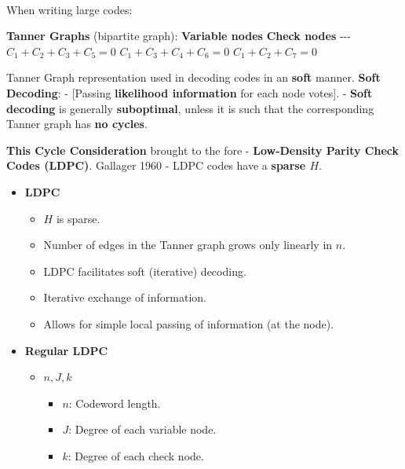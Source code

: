 \documentclass[11pt]{article}
\providecommand{\tightlist}{%
      \setlength{\itemsep}{0pt}\setlength{\parskip}{0pt}}
\newcommand{\prompt}[4]{
        {\ttfamily\llap{{\color{#2}[#3]:\hspace{3pt}#4}}\vspace{-\baselineskip}}
    }
\begin{document}
            
\prompt{Out}{outcolor}{56}{}
    
    \begin{center}
    \end{center}
    { \hspace*{\fill} \\}
    

    When writing large codes:

\textbf{Tanner Graphs} (bipartite graph): \textbar{} \textbf{Variable
nodes} \textbar{} \textbf{Check nodes} \textbar{} \textbar{}
\textbar-\textbar-\textbar-\textbar{} \textbar{} \textbar{} \textbar{}
\(C_1 + C_2 + C_3 + C_5 = 0\) \textbar{} \textbar{} \textbar{}
\textbar{} \(C_1 + C_3 + C_4 + C_6 = 0\) \textbar{} \textbar{}
\textbar{} \(C_1 + C_2 + C_7 = 0\)

Tanner Graph representation used in decoding codes in an \textbf{soft}
manner. \textbf{Soft Decoding}: - {[}Passing \textbf{likelihood
information} for each node votes{]}. - \textbf{Soft decoding} is
generally \textbf{suboptimal}, unless it is such that the corresponding
Tanner graph has \textbf{no cycles}.

\textbf{This Cycle Consideration} brought to the fore -
\textbf{Low-Density Parity Check Codes (LDPC)}. Gallager 1960 - LDPC
codes have a \textbf{sparse \(H\)}.

    \begin{itemize}
\tightlist
\item
  \textbf{LDPC}

  \begin{itemize}
  \tightlist
  \item
    \(H\) is sparse.
  \item
    Number of edges in the Tanner graph grows only linearly in \(n\).
  \item
    LDPC facilitates soft (iterative) decoding.
  \item
    Iterative exchange of information.
  \item
    Allows for simple local passing of information (at the node).
  \end{itemize}
\item
  \textbf{Regular LDPC}

  \begin{itemize}
  \tightlist
  \item
    \(n, J, k\)

    \begin{itemize}
    \tightlist
    \item
      \(n\): Codeword length.
    \item
      \(J\): Degree of each variable node.
    \item
      \(k\): Degree of each check node.
    \end{itemize}
  \end{itemize}
\end{itemize}
\end{document}
